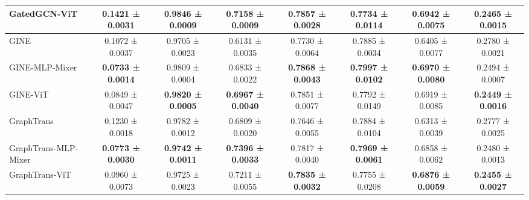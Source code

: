 \documentclass{article}
\begin{document}
\begin{table}[t]
\begin{tabular}{lccccccc}
    {GatedGCN-ViT} 
    & \bf{0.1421 ± 0.0031}    %
    & \bf{0.9846 ± 0.0009}    %
    & \bf{0.7158 ± 0.0009}    %
    & {0.7857 ± 0.0028}    %
    & {0.7734 ± 0.0114}    %
    & \bf{0.6942 ± 0.0075}    %
    & \bf{0.2465 ± 0.0015}    %
    \\
    \midrule
    
    GINE 
    & 0.1072 ± 0.0037 %
    & 0.9705 ± 0.0023 %
    & 0.6131 ± 0.0035 %
    & 0.7730 ± 0.0064 %
    & 0.7885 ± 0.0034 %
    & 0.6405 ± 0.0077 %
    & 0.2780 ± 0.0021 %
    \\
    
  
    {GINE-MLP-Mixer}
    & {\bf {0.0733 ± 0.0014}} %
    & {{0.9809 ± 0.0004}}          %
    & {{0.6833 ± 0.0022}}           %
    & {\bf{0.7868 ± 0.0043}}          %
    & {\bf{0.7997 ± 0.0102}}           %
    & {\bf{0.6970 ± 0.0080}}          %
    & {{0.2494 ± 0.0007}}           %
    \\

    {GINE-ViT} 
    & {0.0849 ± 0.0047}    %
    & \bf{0.9820 ± 0.0005}    %
    & \bf{0.6967 ± 0.0040}    %
    & {0.7851 ± 0.0077}    %
    & {0.7792 ± 0.0149}    %
    & {0.6919 ± 0.0085}    %
    & \bf{0.2449 ± 0.0016}    %
    \\
    \midrule
    
    GraphTrans
    & 0.1230 ± 0.0018
    & 0.9782 ± 0.0012
    & 0.6809 ± 0.0020
    & 0.7646 ± 0.0055
    & 0.7884 ± 0.0104
    & 0.6313 ± 0.0039
    & 0.2777 ± 0.0025
    \\


    GraphTrans-MLP-Mixer
    & {\bf {0.0773 ± 0.0030}} %
    & {\bf {0.9742 ± 0.0011}}          %
    & {\bf {0.7396 ± 0.0033}}           %
    & {{0.7817 ± 0.0040}}          %
    & {\bf{0.7969 ± 0.0061}}           %
    & {{0.6858 ± 0.0062}}          %
    & {{0.2480 ± 0.0013}}           %
    \\
    
    {GraphTrans-ViT} 
    & {0.0960 ± 0.0073}    %
    & {0.9725 ± 0.0023}    %
    & {0.7211 ± 0.0055}    %
    & \bf{0.7835 ± 0.0032}    %
    & {0.7755 ± 0.0208}    %
    & \bf{0.6876 ± 0.0059}    %
    & \bf{0.2455 ± 0.0027}    %
    \\
    \bottomrule
    \end{tabular}
\end{table}
\end{document}

